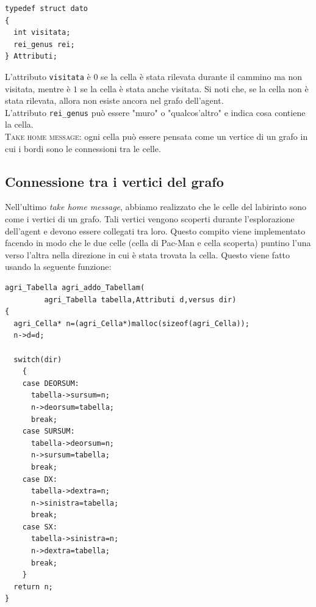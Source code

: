 \documentclass[8pt]{book}
\begin{document}
  \begin{spacing}{0.9}
    \begin{small}
      \begin{tcolorbox}
\begin{verbatim}
typedef struct dato
{
  int visitata;
  rei_genus rei;
} Attributi;
\end{verbatim}
    \end{tcolorbox}
  \end{small}
\end{spacing}

L'attributo \texttt{visitata} è $0$ se la cella è stata rilevata durante il cammino ma non visitata, mentre è $1$ se  la cella è stata anche visitata. Si noti che, se la cella non è stata rilevata, allora non esiste ancora nel grafo dell'agent.\\
L'attributo \texttt{rei\_genus} può essere "muro" o "qualcos'altro" e indica cosa contiene la cella.\\

\textsc{Take home message:}  ogni cella può essere pensata come un vertice di un grafo in cui i bordi sono le connessioni tra le celle.

\subsection{Connessione tra i vertici del grafo}\label{tocux5f30}

Nell'ultimo \emph{take home message}, abbiamo realizzato che le celle del labirinto sono come i vertici di un grafo. Tali vertici vengono scoperti durante l'esplorazione dell'agent e devono essere collegati tra loro. Questo compito viene implementato facendo in modo che le due celle (cella di Pac-Man e cella scoperta) puntino l'una verso l'altra nella direzione in cui è stata trovata la cella. Questo viene fatto usando la seguente funzione:

  \begin{spacing}{0.9}
    \begin{small}
      \begin{tcolorbox}
\begin{verbatim}
agri_Tabella agri_addo_Tabellam(
	     agri_Tabella tabella,Attributi d,versus dir)
{
  agri_Cella* n=(agri_Cella*)malloc(sizeof(agri_Cella));
  n->d=d;
  
  switch(dir)
    {
    case DEORSUM:
      tabella->sursum=n;
      n->deorsum=tabella;
      break;
    case SURSUM:
      tabella->deorsum=n;
      n->sursum=tabella;
      break;
    case DX:
      tabella->dextra=n;
      n->sinistra=tabella;
      break;
    case SX:
      tabella->sinistra=n;
      n->dextra=tabella;
      break;
    }
  return n;
}
\end{verbatim}
    \end{tcolorbox}
  \end{small}
\end{spacing}
\end{document}
